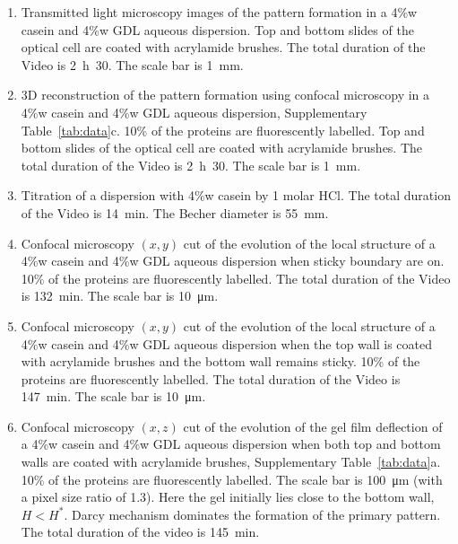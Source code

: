\documentclass[twocolumn,superscriptaddress,showpacs,preprintnumbers,
amsmath,amssymb,prl]{revtex4-1}
\begin{document}
\begin{enumerate}
\renewcommand{\labelenumi}{\textbf{Video \arabic{enumi}:}}
\itemindent 8mm
\item\label{vid:transmitted} Transmitted light microscopy images of the pattern formation in a 4\%w casein and 4\%w GDL aqueous dispersion. Top and bottom slides of the optical cell are coated with acrylamide brushes. The total duration of the Video is \SI{2}{\hour}~30. The scale bar is \SI{1}{\milli\metre}.

\item\label{vid:reconstructed} 3D reconstruction of the pattern formation using confocal microscopy in a 4\%w casein and 4\%w GDL aqueous dispersion, Supplementary Table~\ref{tab:data}c. 10\% of the proteins are fluorescently labelled. Top and bottom slides of the optical cell are coated with acrylamide brushes. The total duration of the Video is \SI{2}{\hour}~30. The scale bar is \SI{1}{\milli\metre}.




\item\label{vid:titration} Titration of a dispersion with 4\%w casein by 1 molar HCl. The total duration of the Video is \SI{14}{\minute}. The Becher diameter is \SI{55}{\milli\metre}.


\item\label{vid:stick63} Confocal microscopy $(x,y)$ cut of the evolution of the local structure of a 4\%w casein and 4\%w GDL aqueous dispersion when sticky boundary are on. 10\% of the proteins are fluorescently labelled. The total duration of the Video is \SI{132}{\minute}. The scale bar is \SI{10}{\micro\metre}.

\item\label{vid:nostick63} Confocal microscopy $(x,y)$ cut of the evolution of the local structure of a 4\%w casein and 4\%w GDL aqueous dispersion when the top wall is coated with acrylamide brushes and the bottom wall remains sticky. 10\% of the proteins are fluorescently labelled. The total duration of the Video is \SI{147}{\minute}. The scale bar is \SI{10}{\micro\metre}.

\item\label{vid:cutDarcy} Confocal microscopy $(x,z)$ cut of the evolution of the gel film deflection of a 4\%w casein and 4\%w GDL aqueous dispersion when both top and bottom walls are coated with acrylamide brushes, Supplementary Table~\ref{tab:data}a. 10\% of the proteins are fluorescently labelled. The scale bar is \SI{100}{\micro\metre} (with a pixel size ratio of 1.3). Here the gel initially lies close to the bottom wall, $H<H^*$. Darcy mechanism dominates the formation of the primary pattern. The total duration of the video is \SI{145}{\minute}.


\end{enumerate}
\end{document}

